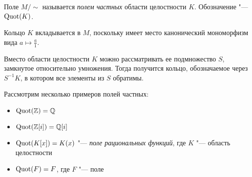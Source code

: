\begin{definition}
	Поле $M /{\sim}$ называется \textit{полем частных} области целостности $K$. Обозначение "--- $\operatorname{Quot}(K)$.
\end{definition}

\begin{note}
	Кольцо $K$ вкладывается в $M$, поскольку имеет место канонический мономорфизм вида $a \mapsto \frac{a}{1}$.
\end{note}

\begin{note}
	Вместо области целостности $K$ можно рассматривать ее подмножество $S$, замкнутое относительно умножения. Тогда получится кольцо, обозначаемое через $S^{-1}K$, в котором все элементы из $S$ обратимы.
\end{note}

\begin{example}
	Рассмотрим несколько примеров полей частных:
	\begin{itemize}
		\item $\operatorname{Quot}(\mathbb{Z}) = \mathbb{Q}$
		\item $\operatorname{Quot}(\mathbb{Z}[i]) = \mathbb{Q}[i]$
		\item $\operatorname{Quot}(K[x]) = K(x)$ "--- \textit{поле рациональных функций}, где $K$ "--- область целостности
		\item $\operatorname{Quot}(F) = F$, где $F$ "--- поле
	\end{itemize}
\end{example}